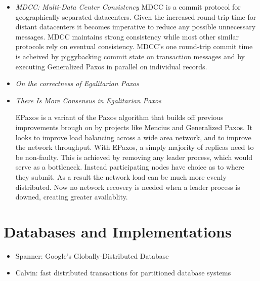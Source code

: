 \documentclass{article}
\begin{document}
\begin{itemize}
	\item
	\textit{MDCC: Multi-Data Center Consistency} \cite{MDCC}
	MDCC is a commit protocol for geographically separated datacenters.
	Given the increased round-trip time for distant datacenters it becomes imperative to reduce any possible unnecessary messages. MDCC maintains strong consistency while most other similar protocols rely on eventual consistency.
	MDCC's one round-trip commit time is acheived by piggybacking commit state on transaction messages
	and by executing Generalized Paxos in parallel on individual records.
	

	\item
	\textit{On the correctness of Egalitarian Paxos} \cite{SutraEPaxos}


	\item
	\textit{There Is More Consensus in Egalitarian Paxos} \cite{EPaxos}

	EPaxos is a variant of the Paxos algorithm that builds off previous improvements brough on by projects like Mencius and Generalized Paxos.
	It looks to improve load balancing across a wide area network, and to improve the network throughput. With EPaxos, a simply majority of replicas need to be non-faulty.
	This is achieved by removing any leader process, which would serve as a bottleneck. Instead participating nodes have choice as to where they submit.
	As a result the network load can be much more evenly distributed. Now no network recovery is needed when a leader process is downed, creating greater availablity.


\end{itemize}

\section{Databases and Implementations}

\begin{itemize}
	\item{Spanner: Google's Globally-Distributed Database \cite{Spanner}}

	\item{Calvin: fast distributed transactions for partitioned database systems \cite{Calvin}}
\end{itemize}



\end{document}
